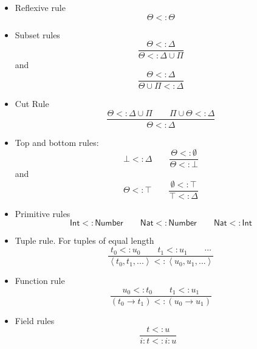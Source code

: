 \documentclass[12pt]{article}
\begin{document}
\begin{itemize}
\item Reflexive rule%
\begin{equation*}
\Theta <:\Theta 
\end{equation*}

\item Subset rules%
\begin{equation*}
\frac{\Theta <:\Delta }{\Theta <:\Delta \cup \Pi }
\end{equation*}%
and%
\begin{equation*}
\frac{\Theta <:\Delta }{\Theta \cup \Pi <:\Delta }
\end{equation*}

\item Cut Rule%
\begin{equation*}
\frac{\Theta <:\Delta \cup \Pi \qquad \Pi \cup \Theta <:\Delta }{\Theta
<:\Delta }
\end{equation*}

\item Top and bottom rules:%
\begin{equation*}
\bot <:\Delta \qquad \frac{\Theta <:\emptyset }{\Theta <:\bot }
\end{equation*}%
and%
\begin{equation*}
\Theta <:\top \qquad \frac{\emptyset <:\top }{\top <:\Delta }
\end{equation*}

\item Primitive rules%
\begin{equation*}
\mathsf{Int}<:\mathsf{Number}\qquad \mathsf{Nat}<:\mathsf{Number}\qquad 
\mathsf{Nat}<:\mathsf{Int}
\end{equation*}

\item Tuple rule. For tuples of equal length%
\begin{equation*}
\frac{t_{0}<:u_{0}\qquad t_{1}<:u_{1}\qquad \cdots }{\left\langle
t_{0},t_{1},...\right\rangle <:\left\langle u_{0},u_{1},...\right\rangle }
\end{equation*}

\item Function rule%
\begin{equation*}
\frac{u_{0}\mathsf{<:}t_{0}\qquad t_{1}\mathsf{<:}u_{1}}{\left(
t_{0}\rightarrow t_{1}\right) <:\left( u_{0}\rightarrow u_{1}\right) }
\end{equation*}

\item Field rules%
\begin{equation*}
\frac{t<:u}{i\colon t<:i\colon u}\text{ }
\end{equation*}


\end{itemize}
\end{document}
